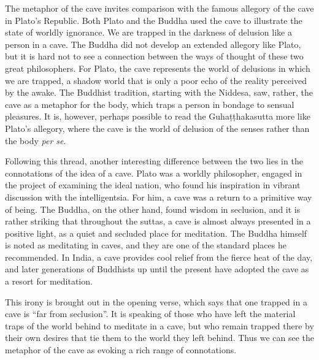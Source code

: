\documentclass[12pt,openany]{book}%
\begin{document}
The metaphor of the cave invites comparison with the famous allegory of the cave in Plato’s Republic. Both Plato and the Buddha used the cave to illustrate the state of worldly ignorance. We are trapped in the darkness of delusion like a person in a cave. The Buddha did not develop an extended allegory like Plato, but it is hard not to see a connection between the ways of thought of these two great philosophers. For Plato, the cave represents the world of delusions in which we are trapped, a shadow world that is only a poor echo of the reality perceived by the awake. The Buddhist tradition, starting with the Niddesa, saw, rather, the cave as a metaphor for the body, which traps a person in bondage to sensual pleasures. It is, however, perhaps possible to read the \textsanskrit{Guhaṭṭhakasutta} more like Plato’s allegory, where the cave is the world of delusion of the senses rather than the body \emph{per se}.

Following this thread, another interesting difference between the two lies in the connotations of the idea of a cave. Plato was a worldly philosopher, engaged in the project of examining the ideal nation, who found his inspiration in vibrant discussion with the intelligentsia. For him, a cave was a return to a primitive way of being. The Buddha, on the other hand, found wisdom in seclusion, and it is rather striking that throughout the suttas, a cave is almost always presented in a positive light, as a quiet and secluded place for meditation. The Buddha himself is noted as meditating in caves, and they are one of the standard places he recommended. In India, a cave provides cool relief from the fierce heat of the day, and later generations of Buddhists up until the present have adopted the cave as a resort for meditation.

This irony is brought out in the opening verse, which says that one trapped in a cave is “far from seclusion”. It is speaking of those who have left the material traps of the world behind to meditate in a cave, but who remain trapped there by their own desires that tie them to the world they left behind. Thus we can see the metaphor of the cave as evoking a rich range of connotations.
\end{document}
